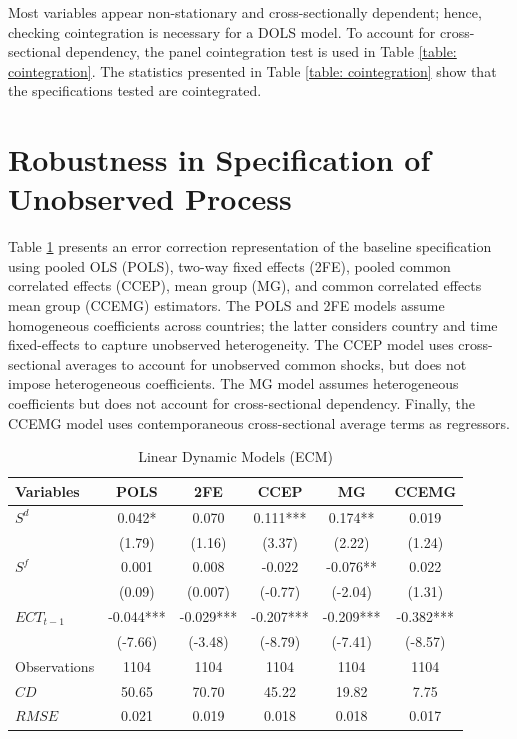 \documentclass[12pt]{article}
\begin{document}
Most variables appear non-stationary and cross-sectionally dependent; hence, checking cointegration is necessary for a DOLS model. To account for cross-sectional dependency, the \citet{Westerlund2007} panel cointegration test is used in Table \ref{table: cointegration}. The statistics presented in Table \ref{table: cointegration} show that the specifications tested are cointegrated.

\section{Robustness in Specification of Unobserved Process} \label{ap: C} 

Table \ref{tab: pooled} presents an error correction representation of the baseline specification using pooled OLS (POLS), two-way fixed effects (2FE), pooled common correlated effects (CCEP), mean group (MG), and common correlated effects mean group (CCEMG) estimators. The POLS and 2FE models assume homogeneous coefficients across countries; the latter considers country and time fixed-effects to capture unobserved heterogeneity. The CCEP model uses cross-sectional averages to account for unobserved common shocks, but does not impose heterogeneous coefficients. The MG model assumes heterogeneous coefficients but does not account for cross-sectional dependency. Finally, the CCEMG model uses contemporaneous cross-sectional average terms as regressors. 

\begin{table}[h!]
    \centering
    \doublespacing
      \setlength{\tabcolsep}{1pt} 
        \caption{Linear Dynamic Models (ECM)}
  \begin{tabular*}{\textwidth}{@{\extracolsep{\fill}}l*{5}{c}}
    \hline
        Variables & POLS  & 2FE & CCEP & MG & CCEMG  \\
         \hline
        $S^d$ & 0.042* & 0.070  & 0.111***  & 0.174** & 0.019 \\
         & (1.79)  & (1.16) & (3.37) & (2.22) & (1.24) \\
        $S^f$ & 0.001 & 0.008 & -0.022 & -0.076** & 0.022 \\
         & (0.09) & (0.007) & (-0.77) & (-2.04) &  (1.31) \\
        $ECT_{t-1}$ & -0.044*** & -0.029*** & -0.207*** & -0.209***  & -0.382*** \\
         & (-7.66) & (-3.48) & (-8.79) & (-7.41)  &  (-8.57) \\
         \hline
         Observations& 1104 &  1104 & 1104 & 1104 & 1104 \\
         $CD$& 50.65 & 70.70 & 45.22 & 19.82  & 7.75 \\
         $RMSE$& 0.021 & 0.019 & 0.018  & 0.018 & 0.017 \\
         \hline
    \end{tabular*}
    \label{tab: pooled}
\end{table}
\end{document}
